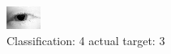 \begin{figure}[h!]
\begin{center}
\includegraphics[width=0.60\columnwidth]{figures/ID160_class_4_target_3.png}
\end{center}
\caption{ Classification: 4 actual target: 3}
\label{fig:ID160_class_4_target_3}
\end{figure}

